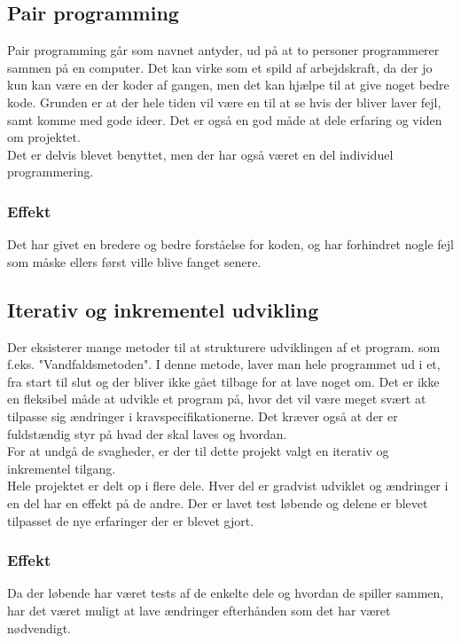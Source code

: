 \subsection{Pair programming}

Pair programming går som navnet antyder, ud på at to personer programmerer sammen på en computer. Det kan virke som et spild af arbejdskraft, da der jo kun kan være en der koder af gangen, men det kan hjælpe til at give noget bedre kode. Grunden er at der hele tiden vil være en til at se hvis der bliver laver fejl, samt komme med gode ideer. Det er også en god måde at dele erfaring og viden om projektet.\\

Det er delvis blevet benyttet, men der har også været en del individuel programmering.

\subsubsection{Effekt}
Det har givet en bredere og bedre forståelse for koden, og har forhindret nogle fejl som måske ellers først ville blive fanget senere.

\subsection{Iterativ og inkrementel udvikling}
Der eksisterer mange metoder til at strukturere udviklingen af et program. som f.eks. "Vandfaldsmetoden". I denne metode, laver man hele programmet ud i et, fra start til slut og der bliver ikke gået tilbage for at lave noget om. Det er ikke en fleksibel måde at udvikle et program på, hvor det vil være meget svært at tilpasse sig ændringer i kravspecifikationerne. Det kræver også at der er fuldstændig styr på hvad der skal laves og hvordan.\\

For at undgå de svagheder, er der til dette projekt valgt en iterativ og inkrementel tilgang.\\
Hele projektet er delt op i flere dele. Hver del er gradvist udviklet og ændringer i en del har en effekt på de andre. Der er lavet test løbende og delene er blevet tilpasset de nye erfaringer der er blevet gjort.


\subsubsection{Effekt}
Da der løbende har været tests af de enkelte dele og hvordan de spiller sammen, har det været muligt at lave ændringer efterhånden som det har været nødvendigt.\\

